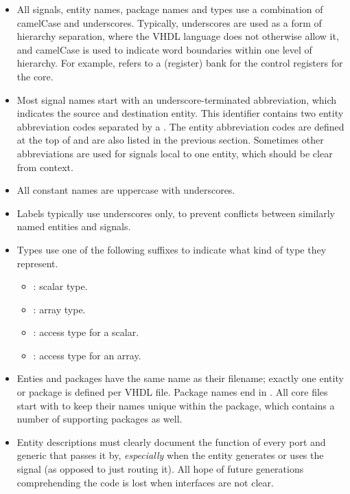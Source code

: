 \begin{itemize}

\item All signals, entity names, package names and types use a combination of 
camelCase and underscores. Typically, underscores are used as a form of 
hierarchy separation, where the VHDL language does not otherwise allow it, and 
camelCase is used to indicate word boundaries within one level of hierarchy. For 
example,  refers to a (register) bank for the control 
registers for the \rvex{} core.

\item Most signal names start with an underscore-terminated abbreviation, which
indicates the source and destination entity. This identifier contains two entity 
abbreviation codes separated by a . The entity abbreviation codes are 
defined at the top of  and are also listed in the previous
section. Sometimes other abbreviations are used for signals local to one entity,
which should be clear from context.

\item All constant names are uppercase with underscores.

\item Labels typically use underscores only, to prevent conflicts between 
similarly named entities and signals.

\item Types use one of the following suffixes to indicate what kind of type they 
represent.
\begin{itemize}
    \item {}: scalar type.
    \item {}: array type.
    \item {}: access type for a scalar.
    \item {}: access type for an array.
\end{itemize}

\item Enties and packages have the same name as their filename; exactly one 
entity or package is defined per VHDL file. Package names end in . 
All \rvex{} core files start with  to keep their names unique within 
the  package, which contains a number of supporting packages as well.

\item Entity descriptions must clearly document the function of every port and
generic that passes it by, \emph{especially} when the entity generates or uses
the signal (as opposed to just routing it). All hope of future generations
comprehending the code is lost when interfaces are not clear.


\end{itemize}
